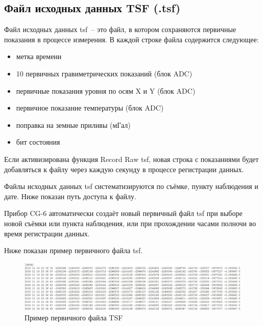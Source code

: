 \subsection[Файл исходных данных]{Файл исходных данных TSF (.tsf)}

Файл исходных данных tsf~-- это файл, в котором сохраняются первичные
показания в процессе измерения. В каждой строке файла содержится следующее:
\begin{itemize}
  \item метка времени

  \item 10 первичных гравиметрических показаний (блок ADC)

  \item первичные показания уровня по осям X и Y (блок ADC)

  \item первичное показание температуры (блок ADC)

  \item поправка на земные приливы (мГал)

  \item бит состояния
\end{itemize}

Если активизирована функция Record Raw tsf, новая строка с показаниями будет
добавляться к файлу через каждую секунду в процессе регистрации данных.

Файлы исходных данных tsf систематизируются по съёмке, пункту наблюдения и
дате. Ниже показан путь доступа к файлу.


Прибор CG-6 автоматически создаёт новый первичный файл tsf при выборе новой
съёмки или пункта наблюдения, или при прохождении часами полночи во время
регистрации данных.

Ниже показан пример первичного файла tsf.

\begin{figure}[h]
  \centering
  \includegraphics[width=\textwidth]{figures/sample_raw_tsf_file_from_a_cg6_autograv}
  \caption{Пример первичного файла TSF \cg{}}
  \label{fig:sample_raw_tsf_file_from_a_cg6_autograv}
\end{figure}


